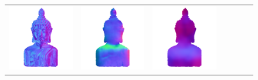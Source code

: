 \begin{figure}
\begin{tabular*}{\linewidth}{@{}c@{}c@{}c@{}c@{}c@{}c@{}c@{}}
\includegraphics[width=\reswidth\linewidth]{figures/results/examples/dpsn_buddha_normals.png} &
\includegraphics[width=\reswidth\linewidth]{figures/results/examples/marrnet_buddha_normals.png} &
\includegraphics[width=\reswidth\linewidth]{figures/results/examples/ef_buddha_normals.png} \\


\end{tabular*}
\end{figure}
